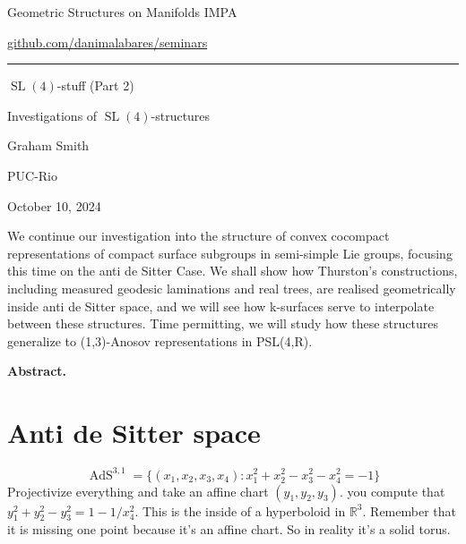 



\begin{minipage}{\textwidth}
	\begin{minipage}{1\textwidth}
		Geometric Structures on Manifolds \hfill IMPA
		
		{\small\hfill\href{https://github.com/danimalabares/seminars}{github.com/danimalabares/seminars}}

		
	\end{minipage}
\end{minipage}\vspace{.2cm}\hrule

\vspace{10pt}

{\Huge  $\operatorname{SL}(4)$-stuff (Part 2)}

{\Large Investigations of $\operatorname{SL}(4)$-structures}


\hfill{\Large Graham Smith}

{\Large \hfill PUC-Rio}

\hfill{\large October 10, 2024}

\vspace{1em}
We continue our investigation into the structure of convex cocompact representations of compact surface subgroups in semi-simple Lie groups, focusing this time on the anti de Sitter Case. We shall show how Thurston's constructions, including measured geodesic laminations and real trees, are realised geometrically inside anti de Sitter space, and we will see how k-surfaces serve to interpolate between these structures. Time permitting, we will study how these structures generalize to (1,3)-Anosov representations in PSL(4,R).

{\color{6}\bfseries Abstract.}\hspace{.5em} 

\tableofcontents

\section{Anti de Sitter space}

\[\operatorname{A d S}^{3,1}=\{(x_1,x_2,x_3,x_4):x_1^2+x_2^2-x_3^2-x_4^2=-1\}\]
Projectivize everything and take an affine chart $(y_1,y_2,y_3)$. you compute that $y_1^2+y_2^2-y_3^2=1-1/x_4^2$. This is the inside of a hyperboloid in $\mathbb{R}^{3}$. Remember that it is missing one point because it's an affine chart. So in reality it's a solid torus.

